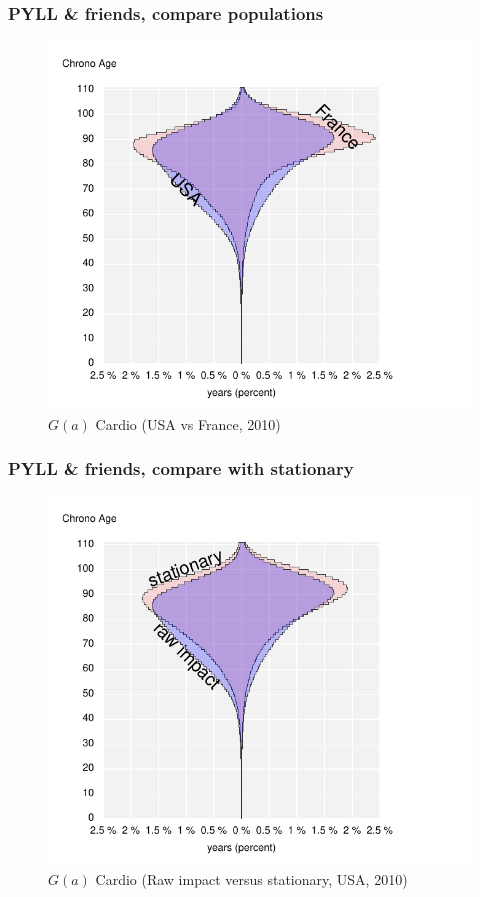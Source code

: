 \documentclass{beamer}
\begin{document}
\begin{frame}
\frametitle{PYLL \& friends, compare populations}
\vspace{-1cm}
\begin{figure}[b]
    \centering
    \includegraphics[scale=.7]{Figures/f12_AgesWoncountries.pdf}
    \caption{$G(a)$ Cardio (USA vs France, 2010)}
\end{figure} 
\end{frame}

\begin{frame}
\frametitle{PYLL \& friends, compare with stationary}
\vspace{-1cm}
\begin{figure}[b]
    \centering
    \includegraphics[scale=.7]{Figures/f13_AgesWonstationary.pdf}
    \caption{$G(a)$ Cardio (Raw impact versus stationary, USA, 2010)}
\end{figure} 
\end{frame}
\end{document}
